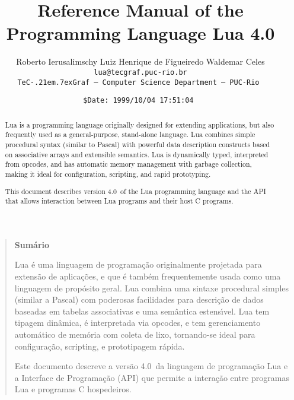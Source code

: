 \documentclass[11pt]{article}
\def\tecgraf{{\sf TeC\kern-.21em\lower.7ex\hbox{Graf}}}
\newcommand{\Version}{4.0}
\begin{document}
\title{Reference Manual of the Programming Language Lua \Version}

\author{%
Roberto Ierusalimschy\quad
Luiz Henrique de Figueiredo\quad
Waldemar Celes
\vspace{1.0ex}\\
\smallskip
\small\tt lua@tecgraf.puc-rio.br
\vspace{2.0ex}\\
\tecgraf\ --- Computer Science Department --- PUC-Rio
}

\date{{\small \tt\$Date: 1999/10/04 17:51:04 $ $}}

\maketitle

\thispagestyle{empty}
\pagestyle{empty}

\begin{abstract}
\noindent
Lua is a programming language originally designed for extending applications,
but also frequently used as a general-purpose, stand-alone language.
Lua combines simple procedural syntax (similar to Pascal)
with powerful data description constructs based on associative
arrays and extensible semantics.
Lua is dynamically typed, interpreted from opcodes,
and has automatic memory management with garbage collection,
making it ideal for configuration, scripting, and rapid prototyping.

This document describes version \Version\ of the Lua programming language
and the API that allows interaction between Lua programs and their
host C programs.
\end{abstract}
\vspace{4ex}
\begin{quotation}
\small
\begin{center}{\bf Sum\'ario}\end{center}
\vspace{1ex}
\noindent
Lua \'e uma linguagem de programa\c{c}\~ao originalmente projetada para
extens\~ao de aplica\c{c}\~oes,
e que \'e tamb\'em frequentemente usada como uma linguagem de
prop\'osito geral.
Lua combina uma sintaxe procedural simples (similar a Pascal)
com poderosas facilidades para descri\c{c}\~ao de dados baseadas
em tabelas associativas e uma sem\^antica estens\'{\i}vel.
Lua tem tipagem din\^amica, \'e interpretada via opcodes,
e tem gerenciamento autom\'atico de mem\'oria com coleta de lixo,
tornando-se ideal para configura\c{c}\~ao, scripting,
e prototipagem r\'apida.

Este documento descreve a vers\~ao \Version\ da linguagem de
programa\c{c}\~ao Lua e a Interface de Programa\c{c}\~ao (API) que permite
a intera\c{c}\~ao entre programas Lua e programas C hospedeiros.
\end{quotation}
\end{document}
